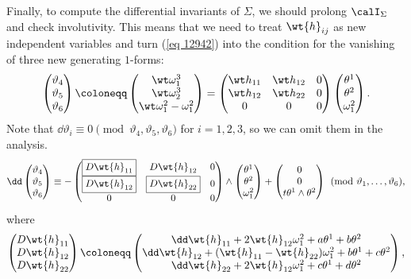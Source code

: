 Finally, to compute the differential invariants of $\Sigma$, we should prolong $\calI_\Sigma$ and check involutivity. This means that we need to treat $\wt{h}_{ij}$ as new independent variables and turn (\ref{eq 12942}) into the condition for the vanishing of three new generating $1$-forms:
\[
    \begin{pmatrix}
        \vartheta_4\\
        \vartheta_5\\
        \vartheta_6
    \end{pmatrix}\coloneqq 
    \begin{pmatrix}
        \wt\omega^3_1\\
        \wt\omega^3_2\\
        \wt\omega^2_1-\omega^2_1
    \end{pmatrix}=
    \begin{pmatrix}
        \wt h_{11} & \wt h_{12} & 0\\
        \wt h_{12} & \wt h_{22} & 0\\
        0 & 0 & 0
    \end{pmatrix}
    \begin{pmatrix}
        \theta^1\\\theta^2\\\omega^2_1
    \end{pmatrix}.
\]
Note that $\dd\vartheta_i\equiv 0\pmod{\vartheta_4,\vartheta_5,\vartheta_6}$ for $i=1,2,3$, so we can omit them in the analysis. 
\[\dd \begin{pmatrix}
    \vartheta_4\\
    \vartheta_5\\
    \vartheta_6
\end{pmatrix} \equiv 
-\begin{pmatrix}
    \boxed{D\wt{h}_{11}} & D\wt{h}_{12} & 0\\
    \boxed{D\wt{h}_{12}} & \boxed{D\wt{h}_{22}} & 0\\
    0 & 0 & 0
\end{pmatrix}\wedge 
\begin{pmatrix}
    \theta^1\\\theta^2\\\omega^2_1
\end{pmatrix}
+\begin{pmatrix}
    0 \\ 0\\ t\theta^1\wedge\theta^2
\end{pmatrix}\pmod{\vartheta_1,\ldots,\vartheta_6},
\]
where 
\[\begin{pmatrix}
    D\wt{h}_{11}\\
    D\wt{h}_{12}\\
    D\wt{h}_{22}
\end{pmatrix}
\coloneqq 
\begin{pmatrix}
    \dd\wt{h}_{11} +2\wt{h}_{12}\omega^2_1+a \theta^1+b\theta^2\\
    \dd\wt{h}_{12}+(\wt{h}_{11}-\wt{h}_{22})\omega^2_1+b\theta^1+c\theta^2\\
    \dd\wt{h}_{22}+2\wt{h}_{12}\omega^2_1+c\theta^1+d\theta^2
\end{pmatrix},
\]
